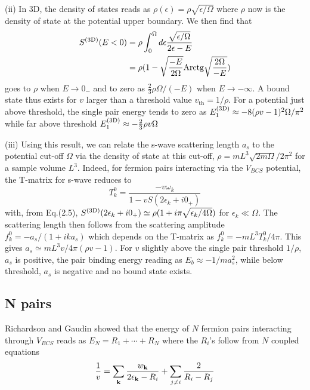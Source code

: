 \documentclass[5p,twocolumn]{elsarticle}
\begin{document}
(ii) In 3D, the density of states reads as  
$\rho(\epsilon)=\rho\sqrt{\epsilon/\Omega}$
where $\rho$ now is the density of state at the potential upper boundary. We then find that
\begin{equation}
\begin{split}
S^{{\text{(3D)}}}(E<0)&=\rho\int_0^{\Omega}{}d\epsilon\frac{\sqrt{\epsilon/\Omega}}{2\epsilon-E}\\
	&=\rho(1-\sqrt{\frac{-E}{2\Omega}}\text{Arctg}\sqrt{\frac{2\Omega}{-E}})
\label{eq:}
\end{split}
\end{equation}
goes to $\rho$ when $E\rightarrow0_-$ and to zero as $\frac{2}{3}\rho\Omega/(-E)$ when $E\rightarrow-\infty$. 
A bound state thus exists for $v$ larger than a threshold value $v_{\text{th}}=1/\rho$.  For a potential just above threshold, the single pair energy tends to zero as 
$
E_1^{{\text{(3D)}}}\approx-8(\rho v-1)^2\Omega/\pi^2
$
while far above threshold
$E_1^{{\text{(3D)}}}\approx-\frac{2}{3}\rho{v}\Omega$

(iii) Using this result, we can relate the s-wave scattering length $a_{s}$ to the potential cut-off $\Omega$ via the density of state  at this cut-off, $\rho=mL^3\sqrt{2m\Omega}/2\pi^2$ for a sample volume $L^3$. Indeed, for fermion pairs interacting via the $V_{BCS}$ potential, the T-matrix for s-wave  reduces to
\begin{equation}
T^{0}_{k}=\frac{-v\omega_k}{1-vS(2\epsilon_k+i0_+)}
\end{equation}
with, from Eq.(2.5), $S^{{\text{(3D)}}}(2\epsilon_k+i0_+)\simeq\rho(1+i\pi\sqrt{\epsilon_k/4\Omega})$  for $\epsilon_k\ll\Omega$. The scattering length then follows from the scattering amplitude $f^0_k= -a_s/(1+ika_s)$ which depends on the T-matrix as $f^0_k= -mL^3T^{0}_{k}/4\pi$. This gives $a_s\simeq mL^3v/4\pi(\rho v-1)$. For $v$ slightly above the single pair threshold $1/\rho $, $a_s$ is positive, the pair binding energy reading as $E_{b}\approx-1/ma_s^{2}$, while below threshold, $a_s$ is negative and no bound state exists. 

\subsection{N pairs\label{sec:NPair}}
Richardson \cite{Richardson1} and Gaudin \cite{gaudin} showed that the energy of $N$ fermion pairs interacting through $V_ {BCS}$ reads as $E_N=R_1+\cdots+R_N$ where the $R_i$'s follow from $N$ coupled equations
\begin{equation}
\frac{1}{v}=\sum_{\mathbf{k}}\frac{w_{\mathbf{k}}}{2\epsilon_{\mathbf{k}}-R_i}+\sum_{j\neq{}i}\frac{2}{R_i-R_j}
\end{equation}
\end{document}
